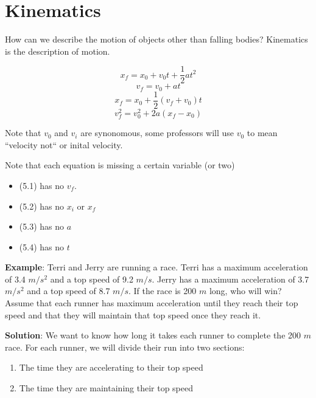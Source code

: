 \chapter{Kinematics}

How can we describe the motion of objects other than falling bodies? Kinematics 
is the description of motion. 



\begin{mdframed}[style=important]
\begin{equation}
    x_f = x_0 + v_0 t + \frac{1}{2}at^2
\end{equation}
\begin{equation}
    v_f = v_0 + at
\end{equation}
\begin{equation}
    x_f = x_0 + \frac{1}{2}\left(v_f + v_0 \right)t
\end{equation}
\begin{equation}
    v_f^2 = v_0^2 + 2a\left(x_f - x_0 \right)
\end{equation}

Note that $v_0$ and $v_i$ are synonomous, some professors will use $v_0$ to mean ``velocity not`` or inital velocity.
\end{mdframed}




Note that each equation is missing a certain variable (or two)
\begin{itemize}
    \item (5.1) has no $v_f$. 
    \item (5.2) has no $x_i$ or $x_f$
    \item (5.3) has no $a$
    \item (5.4) has no $t$
\end{itemize} 

\textbf{Example}: Terri and Jerry are running a race. Terri has a maximum 
acceleration of 3.4 $m/s^2$ and a top speed of 9.2 $m/s$. Jerry has a maximum 
acceleration of 3.7 $m/s^2$ and a top speed of 8.7 $m/s$. If the race is 200 $m$ 
long, who will win? Assume that each runner has maximum acceleration until they 
reach their top speed and that they will maintain that top speed once they reach 
it. 

\textbf{Solution}: We want to know how long it takes each runner to complete the 
200 $m$ race. For each runner, we will divide their run into two sections:
\begin{enumerate}
\item The time they are accelerating to their top speed
\item The time they are maintaining their top speed
\end{enumerate}

